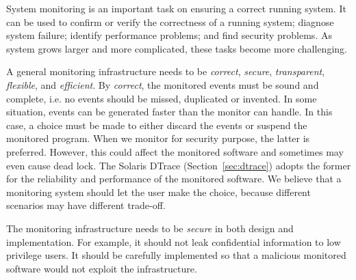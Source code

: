 System monitoring is an important task on ensuring a correct running
system.
It can be used to confirm or verify the correctness of a running system;
diagnose system failure;
identify performance problems;
and find security problems.
As system grows larger and more complicated, these tasks become more
challenging.

A general monitoring infrastructure needs to be
{\em correct}, {\em secure}, {\em transparent}, {\em flexible}, and {\em efficient}.
By {\em correct}, the monitored events must be sound and complete, i.e.
no events should be missed, duplicated or invented.
In some situation, events can be generated faster than the monitor can handle.
In this case, a choice must be made to either discard the events
or suspend the monitored program.
When we monitor for security purpose, the latter is preferred.
However, this could affect the monitored software and sometimes may even
cause dead lock.
The Solaris DTrace (Section~\ref{sec:dtrace}) adopts the former for the
reliability and performance of the monitored software.
We believe that a monitoring system should let the user make the choice,
because different scenarios may have different trade-off.

The monitoring infrastructure needs to be {\em secure} in both design and implementation.
For example, it should not leak confidential information to low privilege users.
It should be carefully implemented so that a malicious monitored
software would not exploit the infrastructure.

